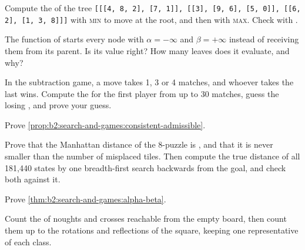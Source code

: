 \begin{exercise}[$\star\star$]\label{exo:b2:search-and-games:5}
Compute the  of the tree \texttt{[[[4, 8, 2], [7, 1]], [[3], [9, 6], [5, 0]], [[6, 2], [1, 3, 8]]]} with
\textsc{min} to move at the root, and then with \textsc{max}. Check with .
\end{exercise}

\begin{exercise}[$\star\star$]\label{exo:b2:search-and-games:6}
The function  of  starts every node with $\alpha = -\infty$ and $\beta = +\infty$
instead of receiving them from its parent. Is its value right? How many leaves does it evaluate, and why?
\end{exercise}

\begin{exercise}[$\star\star$]\label{exo:b2:search-and-games:7}
In the subtraction game, a move takes 1, 3 or 4 matches, and whoever takes the last wins. Compute the  for the
first player from up to 30 matches, guess the losing , and prove your guess.
\end{exercise}

\begin{exercise}[$\star\star$]\label{exo:b2:search-and-games:8}
Prove \cref{prop:b2:search-and-games:consistent-admissible}.
\end{exercise}

\begin{exercise}[$\star\star$]\label{exo:b2:search-and-games:9}
Prove that the Manhattan distance of the 8-puzzle is , and that it is never smaller than the number of
misplaced tiles. Then compute the true distance of all 181,440 states by one breadth-first search backwards from the
goal, and check both  against it.
\end{exercise}

\begin{exercise}[$\star\star\star$]\label{exo:b2:search-and-games:10}
Prove \cref{thm:b2:search-and-games:alpha-beta}.
\end{exercise}

\begin{exercise}[$\star\star\star$]\label{exo:b2:search-and-games:11}
Count the  of noughts and crosses reachable from the empty board, then count them up to the rotations and
reflections of the square, keeping one representative of each class.
\end{exercise}

